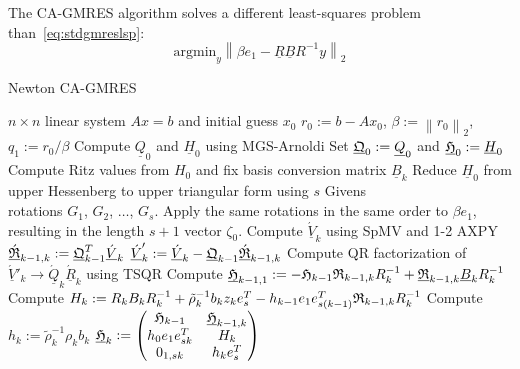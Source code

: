 \documentclass{scrartcl}
\newcommand{\norm}[1]{\left\lVert#1\right\rVert}
\begin{document}
The CA-GMRES algorithm solves a different least-squares problem than~\eqref{eq:stdgmreslsp}:
\begin{equation}
	\text{argmin}_y \norm{\beta e_1 - \underline{R} \underline{B} R^{-1} y}_2
\end{equation}

\begin{algorithm}[H]
\caption{Newton CA-GMRES}
\label{alg:ca-gmres}
\begin{algorithmic}[1]
    \REQUIRE $n \times n$ linear system $Ax = b$ and initial guess $x_0$
    \STATE $r_0:=b-Ax_0$, $\beta := \norm{r_0}_2$, $q_1 := r_0/\beta$
        	\STATE Compute $\underline{Q}_0$ and $\underline{H}_0$ using MGS-Arnoldi
        	\STATE Set $\underline{\frak{Q}}_0 := \underline{Q}_0$ and $\underline{\frak{H}}_0 := \underline{H}_0$
        	\STATE Compute Ritz values from $H_0$ and fix basis conversion matrix $\underline{B}_k$
			\STATE Reduce $\underline{H}_0$ from upper Hessenberg to upper triangular form using $s$ Givens \\
\hspace{\algorithmicindent} rotations $G_1$, $G_2$, $ \ldots$, $G_s$. Apply the same rotations in the same order to $\beta e_1$, \\
\hspace{\algorithmicindent} resulting in the length $s + 1$ vector $\zeta_0$.
		\ELSE
			\STATE Compute $\underline{\acute{V}}_k$ using SpMV and 1-2  AXPY
			\STATE $\underline{\acute{\frak{R}}}_{k-1,k} := \underline{\frak{Q}}^T_{k-1} \underline{\acute{V}}_k$
			\STATE $\underline{\acute{V}}'_k := \underline{\acute{V}}_k - \underline{\frak{Q}}_{k-1}\underline{\acute{\frak{R}}}_{k-1,k}$
			\STATE Compute QR factorization of $\underline{\acute{V}}'_k \rightarrow \underline{\acute{Q}}_k \underline{\acute{R}}_k$ using TSQR
			\STATE Compute $\underline{\frak{H}}_{k-1,1}:= - \frak{H}_{k-1} \frak{R}_{k-1,k} R^{-1}_k + \underline{\frak{R}}_{k-1,k} \underline{B}_k R^{-1}_k$
			\STATE Compute $H_k := R_k B_k R^{-1}_k + \tilde{\rho}^{-1}_k b_k z_k e^T_s - h_{k-1} e_1 e^T_{s(k-1)} \frak{R}_{k-1,k} R^{-1}_k$
			\STATE Compute $h_k := \tilde{\rho}^{-1}_k \rho_k b_k$
			\STATE $\underline{\frak{H}}_k := 
			\begin{pmatrix}
				\frak{H}_{k - 1} & \underline{\frak{H}}_{k - 1,k} \\
				h_0 e_1 e^T_{sk} & H_k \\
				0_{1,sk} & h_k e^T_s \\
			\end{pmatrix}$

\end{algorithmic}
\end{algorithm}
\end{document}
